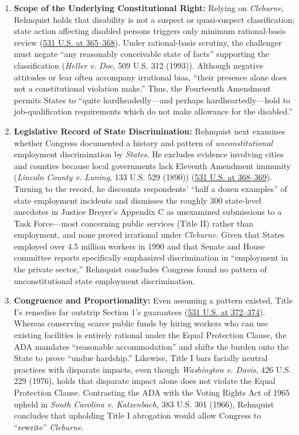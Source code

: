 \documentclass[12pt]{article}
\begin{document}
\begin{enumerate}
\item \textbf{Scope of the Underlying Constitutional Right:} Relying on \textit{Cleburne}, Rehnquist holds that disability is not a suspect or quasi-suspect classification; state action affecting disabled persons triggers only minimum rational-basis review (\href{https://supreme.justia.com/cases/federal/us/531/356/}{531 U.S. at 365--368}). Under rational-basis scrutiny, the challenger must negate ``any reasonably conceivable state of facts'' supporting the classification (\textit{Heller v. Doe}, 509 U.S. 312 (1993)). Although negative attitudes or fear often accompany irrational bias, ``their presence alone does not a constitutional violation make.'' Thus, the Fourteenth Amendment permits States to ``quite hardheadedly---and perhaps hardheartedly---hold to job-qualification requirements which do not make allowance for the disabled.''
\item \textbf{Legislative Record of State Discrimination:} Rehnquist next examines whether Congress documented a history and pattern of \textit{unconstitutional} employment discrimination by \textit{States}. He excludes evidence involving cities and counties because local governments lack Eleventh Amendment immunity (\textit{Lincoln County v. Luning}, 133 U.S. 529 (1890)) (\href{https://supreme.justia.com/cases/federal/us/531/356/}{531 U.S. at 368--369}). Turning to the record, he discounts respondents' ``half a dozen examples'' of state employment incidents and dismisses the roughly 300 state-level anecdotes in Justice Breyer's Appendix C as unexamined submissions to a Task Force---most concerning public services (Title II) rather than employment, and none proved irrational under \textit{Cleburne}. Given that States employed over 4.5 million workers in 1990 and that Senate and House committee reports specifically emphasized discrimination in ``employment in the private sector,'' Rehnquist concludes Congress found no pattern of unconstitutional state employment discrimination.
\item \textbf{Congruence and Proportionality:} Even assuming a pattern existed, Title I's remedies far outstrip Section 1's guarantees (\href{https://supreme.justia.com/cases/federal/us/531/356/}{531 U.S. at 372--374}). Whereas conserving scarce public funds by hiring workers who can use existing facilities is entirely rational under the Equal Protection Clause, the ADA mandates ``reasonable accommodation'' and shifts the burden onto the State to prove ``undue hardship.'' Likewise, Title I bars facially neutral practices with disparate impacts, even though \textit{Washington v. Davis}, 426 U.S. 229 (1976), holds that disparate impact alone does not violate the Equal Protection Clause. Contrasting the ADA with the Voting Rights Act of 1965 upheld in \textit{South Carolina v. Katzenbach}, 383 U.S. 301 (1966), Rehnquist concludes that upholding Title I abrogation would allow Congress to ``rewrite'' \textit{Cleburne}.
\end{enumerate}
\end{document}
